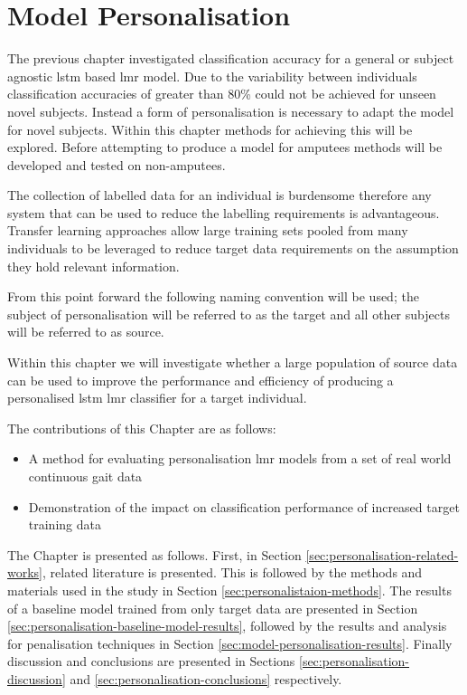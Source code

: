 \chapter{Model Personalisation}
\label{chp:personalisation}

The previous chapter investigated classification accuracy for a general or subject agnostic \acrshort{lstm} based \acrshort{lmr} model. Due to the variability between individuals classification accuracies of greater than 80\% could not be achieved for unseen novel subjects. Instead a form of personalisation is necessary to adapt the model for novel subjects. Within this chapter methods for achieving this will be explored. Before attempting to produce a model for amputees methods will be developed and tested on non-amputees.

The collection of labelled data for an individual is burdensome therefore any system that can be used to reduce the labelling requirements is advantageous. Transfer learning approaches allow large training sets pooled from many individuals to be leveraged to reduce target data requirements on the assumption they hold relevant information.\cite{Fallahzadeh2017, Schneider2021} 

From this point forward the following naming convention will be used; the subject of personalisation will be referred to as the target and all other subjects will be referred to as source.

Within this chapter we will investigate whether a large population of source data can be used to improve the performance and efficiency of producing a personalised \acrshort{lstm} \acrshort{lmr} classifier for a target individual.

The contributions of this Chapter are as follows:
\begin{itemize}
    \item A method for evaluating personalisation \acrshort{lmr} models from a set of real world continuous gait data
    \item Demonstration of the impact on classification performance of increased target training data
\end{itemize}

The Chapter is presented as follows. First, in Section \ref{sec:personalisation-related-works}, related literature is presented. This is followed by the methods and materials used in the study in Section \ref{sec:personalistaion-methods}. The results of a baseline model trained from only target data are presented in Section \ref{sec:personalisation-baseline-model-results}, followed by the results and analysis for penalisation techniques in Section \ref{sec:model-personalisation-results}. Finally discussion and conclusions are presented in Sections \ref{sec:personalisation-discussion} and \ref{sec:personalisation-conclusions} respectively.

